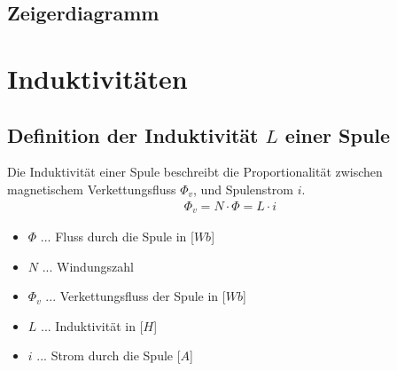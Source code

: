 
\subsection{Zeigerdiagramm}

\newpage

\section{Induktivitäten}
\subsection{Definition der Induktivität $L$ einer Spule}
Die Induktivität einer Spule beschreibt die Proportionalität zwischen magnetischem Verkettungsfluss $\Phi_v$, und Spulenstrom $i$.
\begin{align}
    \Phi_v=N\cdot \Phi = L \cdot i
\end{align}
\begin{itemize}
    \item $\Phi$ ... Fluss durch die Spule in [$Wb$]
    \item $N$ ... Windungszahl
    \item $\Phi_v$ ... Verkettungsfluss der Spule in [$Wb$]
    \item $L$ ... Induktivität in [$H$]
    \item $i$ ... Strom durch die Spule [$A$]
\end{itemize}

